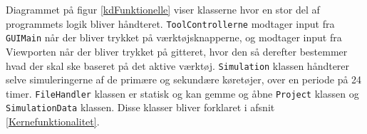 Diagrammet på figur \ref{kdFunktionelle} viser klasserne hvor en stor del af programmets logik bliver håndteret. \texttt{ToolControllerne} modtager input fra \texttt{GUIMain} når der bliver trykket på værktøjsknapperne, og modtager input fra Viewporten når der bliver trykket på gitteret, hvor den så derefter bestemmer hvad der skal ske baseret på det aktive værktøj. \texttt{Simulation} klassen håndterer selve simuleringerne af de primære og sekundære køretøjer, over en periode på 24 timer. \texttt{FileHandler} klassen er statisk og kan gemme og åbne \texttt{Project} klassen og \texttt{SimulationData} klassen. Disse klasser bliver forklaret i afsnit \ref{Kernefunktionalitet}.